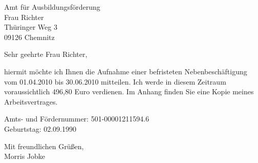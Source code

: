 \documentclass[a4paper,12pt]{article}
\date{\today}
\begin{document}
\begin{letter}{Amt für Ausbildungsförderung\\Frau Richter\\Thüringer Weg 3\\09126 Chemnitz}
\opening{Sehr geehrte Frau Richter,}
hiermit möchte ich Ihnen die Aufnahme einer befristeten Nebenbeschäftigung vom 01.04.2010 bis 30.06.2010 mitteilen. Ich werde in diesem Zeitraum voraussichtlich 496,80 Euro verdienen. Im Anhang finden Sie eine Kopie meines Arbeitsvertrages.

Amts- und Fördernummer: 501-00001211594.6\\
Geburtstag: 02.09.1990

\closing{Mit freundlichen Grüßen,\\ Morris Jobke}
\end{letter}
\end{document}
